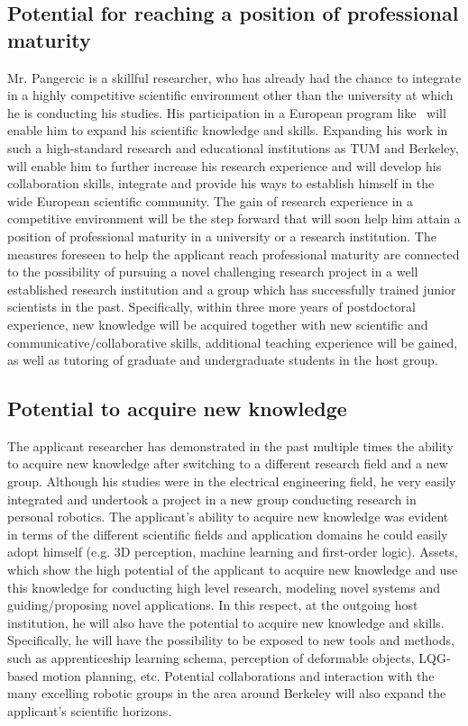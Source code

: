 \subsection{Potential for reaching a position of professional maturity}
Mr. Pangercic is a skillful researcher, who has already had the chance to integrate in a highly 
competitive scientific environment other than the university at which he is conducting his
studies.  His participation in a European program like \ksem\ will enable him to expand 
his scientific knowledge and skills. Expanding his work in such a high-standard research 
and educational institutions as TUM and Berkeley, will enable him to further increase his 
research experience and will develop his collaboration skills, integrate and  provide his 
ways to establish himself in the wide European scientific community. The gain of research 
experience in a competitive environment will be the step forward that will soon help him
attain a position of professional maturity in a university or a research institution. The 
measures foreseen to help the applicant reach professional maturity are connected to the 
possibility of pursuing a novel challenging research project in a well established research 
institution and a group which has successfully trained junior scientists in the past. 
Specifically, within three more years of postdoctoral experience, new knowledge will be 
acquired together with new scientific and communicative/collaborative skills, additional 
teaching experience will be gained, as well as tutoring of graduate and undergraduate 
students in the host group.
\subsection{Potential to acquire new knowledge}
The applicant researcher has demonstrated in the past multiple times the ability to acquire new 
knowledge after switching to a different research field and a new group. Although his
studies were in the electrical engineering field, he very 
easily integrated and undertook a project in a new group conducting  research in personal
robotics. The applicant's ability to acquire new knowledge was evident in terms of 
the different scientific fields and application domains he could easily adopt himself (e.g. 3D perception, machine
learning and first-order logic). Assets, which show the high potential of the applicant to acquire new 
knowledge and use this knowledge for conducting high level research, modeling novel 
systems and guiding/proposing novel applications. In this respect, at the 
outgoing host institution, he will also have the potential to acquire new knowledge and skills. 
Specifically, he will have the possibility to be exposed to new tools and methods, such as 
apprenticeship learning schema, perception of deformable objects, LQG-based motion planning, etc. 
Potential collaborations and interaction with the many excelling 
robotic groups in the area around Berkeley will also 
expand the applicant's scientific horizons. 

\newpage
